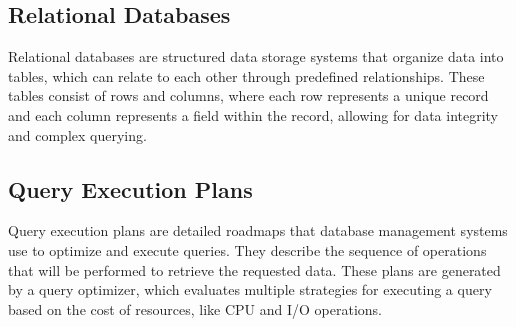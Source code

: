\subsection{Relational Databases}
Relational databases are structured data storage systems that organize data into tables, which can relate to each other through predefined relationships. These tables consist of rows and columns, where each row represents a unique record and each column represents a field within the record, allowing for data integrity and complex querying.

\subsection{Query Execution Plans}
Query execution plans are detailed roadmaps that database management systems use to optimize and execute queries. They describe the sequence of operations that will be performed to retrieve the requested data. These plans are generated by a query optimizer, which evaluates multiple strategies for executing a query based on the cost of resources, like CPU and I/O operations.

